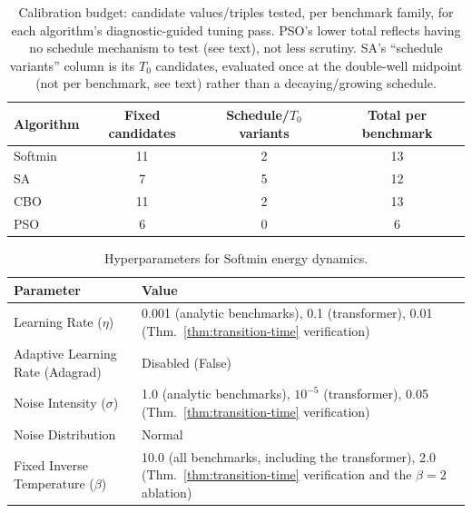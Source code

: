 \documentclass{article} %
\theoremstyle{plain}
\theoremstyle{definition}
\theoremstyle{remark}
\begin{document}
\begin{table}[!htbp]
\centering
\caption{Calibration budget: candidate values/triples tested, per benchmark family, for each algorithm's diagnostic-guided tuning pass. PSO's lower total reflects having no schedule mechanism to test (see text), not less scrutiny. SA's ``schedule variants'' column is its $T_0$ candidates, evaluated once at the double-well midpoint (not per benchmark, see text) rather than a decaying/growing schedule.}
\label{tab:calibration_budget}
\begin{tabular}{@{}lccc@{}}
\toprule
\textbf{Algorithm} & \textbf{Fixed candidates} & \textbf{Schedule/$T_0$ variants} & \textbf{Total per benchmark} \\
\midrule
Softmin & 11 & 2 & 13 \\
SA & 7 & 5 & 12 \\
CBO & 11 & 2 & 13 \\
PSO & 6 & 0 & 6 \\
\bottomrule
\end{tabular}
\end{table}

\begin{table}[!htbp]
\centering
\caption{Hyperparameters for Softmin energy dynamics.}
\label{tab:softmin_hyperparams}
\begin{tabular}{@{}lp{}@{}}
\toprule
\textbf{Parameter} & \textbf{Value} \\
\midrule
Learning Rate ($\eta$) & 0.001 (analytic benchmarks), 0.1 (transformer), 0.01 (Thm.~\ref{thm:transition-time} verification) \\
Adaptive Learning Rate (Adagrad) & Disabled (False) \\
Noise Intensity ($\sigma$) & 1.0 (analytic benchmarks), $10^{-5}$ (transformer), 0.05 (Thm.~\ref{thm:transition-time} verification) \\
Noise Distribution & Normal \\
Fixed Inverse Temperature ($\beta$) & 10.0 (all benchmarks, including the transformer), 2.0 (Thm.~\ref{thm:transition-time} verification and the $\beta=2$ ablation) \\
\bottomrule
\end{tabular}
\end{table}
\end{document}
